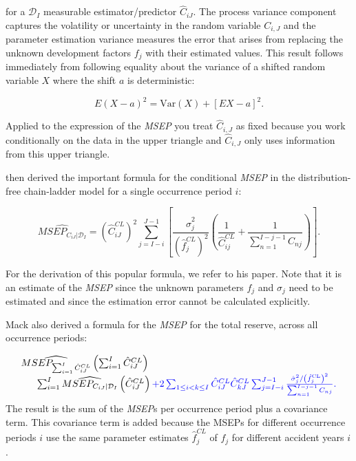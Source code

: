\documentclass[]{book}
\begin{document}
for a \(\mathcal{D}_I\) measurable estimator/predictor \(\hat{C}_{iJ}\).
The process variance component captures the volatility or uncertainty in
the random variable \(C_{i,J}\) and the parameter estimation variance
measures the error that arises from replacing the unknown development
factors \(f_j\) with their estimated values. This result follows
immediately from following equality about the variance of a shifted
random variable \(X\) where the shift \(a\) is deterministic:

\[
E(X-a)^2 = \text{Var}(X)+\left[EX-a\right]^2.
\]

Applied to the expression of the \emph{MSEP} you treat \(\hat{C}_{i,J}\)
as fixed because you work conditionally on the data in the upper
triangle and \(\hat{C}_{i,J}\) only uses information from this upper
triangle.

\citet{Mack1993} then derived the important formula for the conditional
\emph{MSEP} in the distribution-free chain-ladder model for a single
occurrence period \(i\):

\[
\widehat{MSEP_{C_{iJ}|\mathcal{D}_I}}  =
\left(\hat{C}_{iJ}^{CL}\right)^2 \sum_{j=I-i}^{J-1} \left[ \frac{\hat{\sigma}_j^2}{(\hat{f}_j^{CL})^2} \left(\frac{1}{\hat{C}^{CL}_{ij}}+\frac{1}{\sum_{n=1}^{I-j-1}C_{nj}}\right)\right].
\]

For the derivation of this popular formula, we refer to his paper. Note
that it is an estimate of the \emph{MSEP} since the unknown parameters
\(f_j\) and \(\sigma_j\) need to be estimated and since the estimation
error cannot be calculated explicitly.

Mack also derived a formula for the \emph{MSEP} for the total reserve,
across all occurrence periods:

\[
\begin{array}{ll}
\widehat{MSEP_{\sum_{i=1}^I \hat{C}^{CL}_{iJ}}}\left( \sum_{i=1}^I \hat{C}^{CL}_{iJ}  \right) \\
 \ \ \ \ \ \sum_{i=1}^I \widehat{MSEP_{C_{iJ}|\mathcal{D}_I}}\left( \hat{C}^{CL}_{iJ} \right)
\color{blue}{+2 \sum_{1\leq i< k \leq I} \hat{C}_{iJ}^{CL} \hat{C}_{kJ}^{CL}
\sum_{j=I-i}^{J-1} \frac{ \hat{\sigma}_j^2/\left( \hat{f}_j^{\text{CL}} \right)^2 }{ \sum_{n=1}^{I-j-1} C_{nj} }}.
\end{array}
\] The result is the sum of the \emph{MSEP}s per occurrence period plus
a covariance term. This covariance term is added because the MSEPs for
different occurrence periods \(i\) use the same parameter estimates
\(\hat{f}_j^{CL}\) of \(f_j\) for different accident years \(i\).
\end{document}
